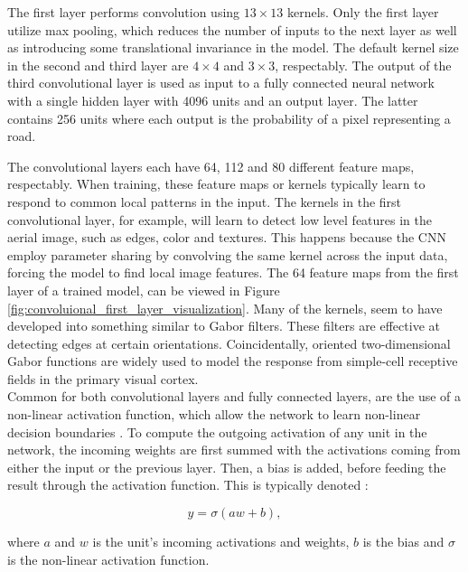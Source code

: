 The first layer performs convolution using $13 \times 13$ kernels. Only the first layer utilize max pooling, which reduces the number of inputs to the next layer as well as introducing some translational invariance in the model. The default kernel size in the second and third layer are $4 \times 4$ and $3 \times 3$, respectably. The output of the third convolutional layer is used as input to a fully connected neural network with a single hidden layer with 4096 units and an output layer. The latter contains 256 units where each output is the probability of a pixel representing a road.\\


The convolutional layers each have 64, 112 and 80 different feature maps, respectably. When training, these feature maps or kernels typically learn to respond to common local patterns in the input. The kernels in the first convolutional layer, for example, will learn to detect low level features in the aerial image, such as edges, color and textures. This happens because the \ac{CNN} employ parameter sharing by convolving the same kernel across the input data, forcing the model to find local image features. The 64 feature maps from the first layer of a trained model, can be viewed in Figure \ref{fig:convoluional_first_layer_visualization}. Many of the kernels,  seem to have developed into something similar to Gabor filters. These filters are effective at detecting edges at certain orientations. Coincidentally, oriented two-dimensional Gabor functions are widely used to model the response from simple-cell receptive fields in the primary visual cortex. \\


Common for both convolutional layers and fully connected layers, are the use of a non-linear activation function, which allow the network to learn non-linear decision boundaries . To compute the outgoing activation of any unit in the network, the incoming weights are first summed with the activations coming from either the input or the previous layer. Then, a bias is added, before feeding the result through the activation function. This is typically denoted :

$$ y = \sigma(aw + b),$$

\noindent where $a$ and  $w$ is the unit's incoming activations and weights, $b$ is the bias and $\sigma$ is the non-linear activation function.\\


